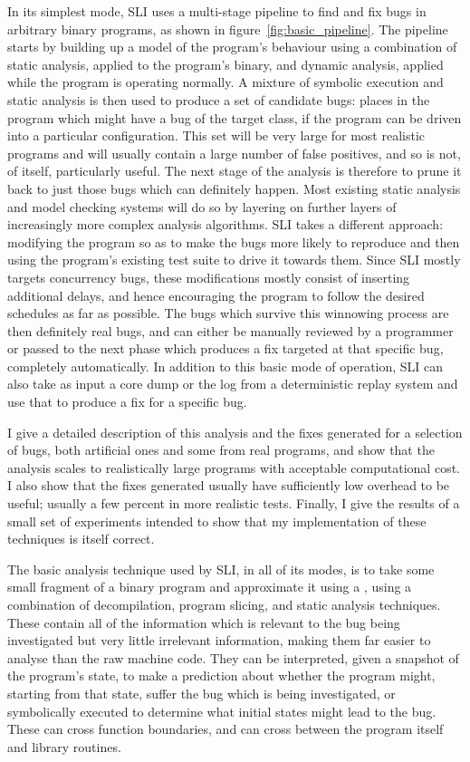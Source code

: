 In its simplest mode, SLI uses a multi-stage pipeline to find and fix bugs in arbitrary binary programs, as shown in figure~\ref{fig:basic_pipeline}.
The pipeline starts by building up a model of the program's behaviour using a combination of static analysis, applied to the program's binary, and dynamic analysis, applied while the program is operating normally.
A mixture of symbolic execution and static analysis is then used to produce a set of candidate bugs: places in the program which might have a bug of the target class, if the program can be driven into a particular configuration.
This set will be very large for most realistic programs and will usually contain a large number of false positives, and so is not, of itself, particularly useful.
The next stage of the analysis is therefore to prune it back to just those bugs which can definitely happen.
Most existing static analysis and model checking systems will do so by layering on further layers of increasingly more complex analysis algorithms.
SLI takes a different approach: modifying the program so as to make the bugs more likely to reproduce and then using the program's existing test suite to drive it towards them.
Since SLI mostly targets concurrency bugs, these modifications mostly consist of inserting additional delays, and hence encouraging the program to follow the desired schedules as far as possible.
The bugs which survive this winnowing process are then definitely real bugs, and can either be manually reviewed by a programmer or passed to the next phase which produces a fix targeted at that specific bug, completely automatically.
In addition to this basic mode of operation, SLI can also take as input a core dump or the log from a deterministic replay system and use that to produce a fix for a specific bug.

I give a detailed description of this analysis and the fixes generated
for a selection of bugs, both artificial ones and some from real
programs, and show that the analysis scales to realistically large
programs with acceptable computational cost.  I also show that the
fixes generated usually have sufficiently low overhead to be useful;
usually a few percent in more realistic tests.  Finally, I give the
results of a small set of experiments intended to show that my
implementation of these techniques is itself correct.

The basic analysis technique used by SLI, in all of its modes, is to take some small fragment of a binary program and approximate it using a \StateMachine, using a combination of decompilation, program slicing, and static analysis techniques.
These \StateMachines contain all of the information which is relevant to the bug being investigated but very little irrelevant information, making them far easier to analyse than the raw machine code.
They can be interpreted, given a snapshot of the program's state, to make a prediction about whether the program might, starting from that state, suffer the bug which is being investigated, or symbolically executed to determine what initial states might lead to the bug.
These \StateMachines can cross function boundaries, and can cross between the program itself and library routines.

